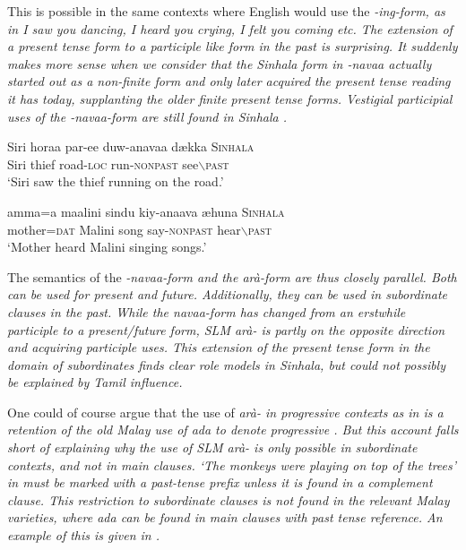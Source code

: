 \documentclass[a4paper,10pt]{article}
\newcommand{\T}{\tz}
\begin{document}
This is possible in the same contexts where English would use the \em -ing\em-form, as in \em I saw you dancing, I heard you crying, I felt you coming \em etc. The extension of a  present tense form to a participle like form in the past is surprising. It suddenly makes more sense when we consider that the Sinhala form in \em -navaa \em actually started out as a non-finite form \citep[163]{Geiger1938} and only later acquired the present tense reading it has today, supplanting the older finite present tense forms. Vestigial participial uses of the \em -navaa\em-form are still found in Sinhala  .

\ea\label{ex:simult:sinh:thief}
\gll Siri horaa par-ee duw-anavaa d\ae{}kka   \textsc{Sinhala} \\
 Siri thief road-\textsc{loc} run-\textsc{nonpast} see$\backslash$\textsc{past}\\
`Siri saw the thief running on the road.' \citep[806]{Gair2003}
\z

\ea\label{ex:simult:sinh:song}
\gll amma=\T{}a maalini sindu kiy-anaava \ae{}huna   \textsc{Sinhala} \\
     mother=\textsc{dat} Malini song say-\textsc{nonpast} hear$\backslash$\textsc{past} \\
`Mother heard Malini singing songs.'\citep[806]{Gair2003}
\z

The semantics of the \em -navaa\em-form and the \em arà\em-form are thus closely parallel. Both can be used for present and future. Additionally, they can be used in subordinate clauses in the past. While the \em navaa\em-form has changed from an erstwhile participle to a present/future form, SLM \em arà- \em is partly on the opposite direction and acquiring participle uses. This extension of the present tense form in the domain of subordinates finds clear role models in Sinhala, but could not possibly be explained by Tamil influence.

One could of course argue that the use of \em arà- \em in progressive contexts as in  is a retention of the old Malay use of \em ada \em to denote progressive \citep{Adelaar1991}. But this account falls short of explaining why the use of SLM \em arà- \em is only possible in \em subordinate \em contexts, and not in main clauses. `The monkeys were playing on top of the trees'  in  must be marked with a past-tense prefix unless it is found in a complement clause. This restriction to subordinate clauses is not found in the relevant Malay varieties, where \em ada \em can be found in main clauses with past tense reference. An example of this is given in .
\end{document}
